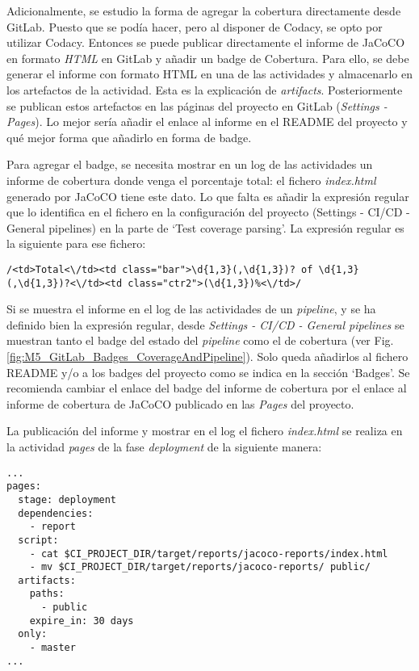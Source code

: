 Adicionalmente, se estudio la forma de agregar la cobertura directamente desde GitLab. Puesto que se podía hacer, pero al disponer de Codacy, se opto por utilizar Codacy. Entonces se puede publicar directamente el informe de JaCoCO en formato \textit{HTML} en GitLab y añadir un badge de Cobertura. Para ello, se debe generar el informe con formato HTML en una de las actividades y almacenarlo en los artefactos de la actividad. Esta es la explicación de \textit{artifacts}. Posteriormente se publican estos artefactos en las páginas del proyecto en GitLab (\textit{Settings - Pages}). Lo mejor sería añadir el enlace al informe en el README del proyecto y qué mejor forma que añadirlo en forma de badge. 

Para agregar el badge, se necesita mostrar en un log de las actividades un informe de cobertura donde venga el porcentaje total: el fichero \textit{index.html} generado por JaCoCO tiene este dato. Lo que falta es añadir la expresión regular que lo identifica en el fichero en la configuración del proyecto (Settings - CI/CD -  General pipelines) en la parte de `Test coverage parsing'. La expresión regular es la siguiente para ese fichero:\\
\begin{minipage}{\linewidth}
{\tiny
\begin{lstlisting}[breaklines]
/<td>Total<\/td><td class="bar">\d{1,3}(,\d{1,3})? of \d{1,3}(,\d{1,3})?<\/td><td class="ctr2">(\d{1,3})%<\/td>/
\end{lstlisting}
}
\end{minipage}
Si se muestra el informe en el log de las actividades de un \textit{pipeline}, y se ha definido bien la expresión regular, desde \textit{Settings - CI/CD -  General pipelines} se muestran tanto el badge del estado del \textit{pipeline} como el de cobertura (ver Fig. \ref{fig:M5_GitLab_Badges_CoverageAndPipeline}). Solo queda añadirlos al fichero README y/o a los badges del proyecto como se indica en la sección `Badges'. Se recomienda cambiar el enlace del badge del informe de cobertura por el enlace al informe de cobertura de JaCoCO publicado en las \textit{Pages} del proyecto.


La publicación del informe y mostrar en el log el fichero \textit{index.html} se realiza en la actividad \textit{pages} de la fase \textit{deployment} de la siguiente manera:\\
\begin{minipage}{\linewidth}
{\tiny
\begin{lstlisting}[breaklines]
...
pages:
  stage: deployment
  dependencies: 
	- report
  script:
	- cat $CI_PROJECT_DIR/target/reports/jacoco-reports/index.html
	- mv $CI_PROJECT_DIR/target/reports/jacoco-reports/ public/
  artifacts:
	paths:
	  - public
	expire_in: 30 days    
  only:
	- master
...
\end{lstlisting}
}
\end{minipage}

